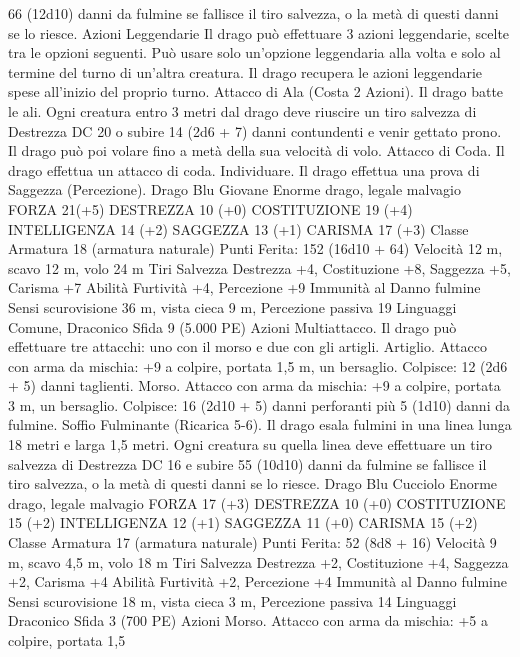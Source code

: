 \begin{multicols}{2}
66 (12d10) danni da fulmine se fallisce il tiro salvezza, o la metà
di questi danni se lo riesce.
Azioni Leggendarie
Il drago può effettuare 3 azioni leggendarie, scelte tra le opzioni
seguenti. Può usare solo un’opzione leggendaria alla volta e solo
al termine del turno di un’altra creatura. Il drago recupera le
azioni leggendarie spese all’inizio del proprio turno.
Attacco di Ala (Costa 2 Azioni). Il drago batte le ali. Ogni
creatura entro 3 metri dal drago deve riuscire un tiro salvezza di
Destrezza DC 20 o subire 14 (2d6 + 7) danni contundenti e venir
gettato prono. Il drago può poi volare fino a metà della sua
velocità di volo.
Attacco di Coda. Il drago effettua un attacco di coda.
Individuare. Il drago effettua una prova di Saggezza
(Percezione).
Drago Blu Giovane
Enorme drago, legale malvagio
FORZA 21(+5)
DESTREZZA 10 (+0)
COSTITUZIONE 19 (+4)
INTELLIGENZA 14 (+2)
SAGGEZZA 13 (+1)
CARISMA 17 (+3)
Classe Armatura 18 (armatura naturale)
\hspace*{0pt}\hfill{Punti Ferita}: 152 (16d10 + 64)
Velocità 12 m, scavo 12 m, volo 24 m
Tiri Salvezza Destrezza +4, Costituzione +8, Saggezza +5,
Carisma +7
Abilità Furtività +4, Percezione +9
Immunità al Danno fulmine
Sensi scurovisione 36 m, vista cieca 9 m, Percezione passiva 19
Linguaggi Comune, Draconico
Sfida 9 (5.000 PE)
Azioni
Multiattacco. Il drago può effettuare tre attacchi: uno con il
morso e due con gli artigli.
Artiglio. Attacco con arma da mischia: +9 a colpire, portata 1,5
m, un bersaglio.
Colpisce: 12 (2d6 + 5) danni taglienti.
Morso. Attacco con arma da mischia: +9 a colpire, portata 3 m,
un bersaglio.
Colpisce: 16 (2d10 + 5) danni perforanti più 5 (1d10) danni da
fulmine.
Soffio Fulminante (Ricarica 5-6). Il drago esala fulmini in una linea
lunga 18 metri e larga 1,5 metri. Ogni creatura su quella linea deve
effettuare un tiro salvezza di Destrezza DC 16 e subire 55 (10d10) danni
da fulmine se fallisce il tiro salvezza, o la metà di questi danni se lo riesce.
Drago Blu Cucciolo
Enorme drago, legale malvagio
FORZA 17 (+3)
DESTREZZA 10 (+0)
COSTITUZIONE 15 (+2)
INTELLIGENZA 12 (+1)
SAGGEZZA 11 (+0)
CARISMA 15 (+2)
Classe Armatura 17 (armatura naturale)
\hspace*{0pt}\hfill{Punti Ferita}: 52 (8d8 + 16)
Velocità 9 m, scavo 4,5 m, volo 18 m
Tiri Salvezza Destrezza +2, Costituzione +4, Saggezza +2,
Carisma +4
Abilità Furtività +2, Percezione +4
Immunità al Danno fulmine
Sensi scurovisione 18 m, vista cieca 3 m, Percezione passiva 14
Linguaggi Draconico
Sfida 3 (700 PE)
Azioni
Morso. Attacco con arma da mischia: +5 a colpire, portata 1,5

\end{multicols}
